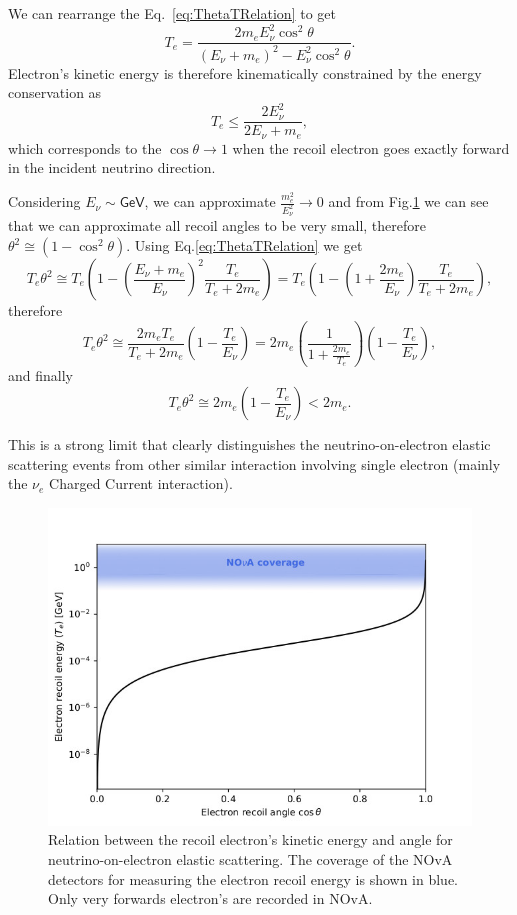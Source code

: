 We can rearrange the Eq.~\ref{eq:ThetaTRelation} to get
\begin{equation}\label{eq:TThetaRelation}
T_e=\frac{2m_eE_\nu^2\cos^2\theta}{\left(E_\nu+m_e\right)^2-E_\nu^2\cos^2\theta}.
\end{equation}
Electron's kinetic energy is therefore kinematically constrained by the energy conservation as
\begin{equation}
T_e\leq\frac{2E_{\nu}^2}{2E_{\nu}+m_e},
\end{equation}
which corresponds to the $\cos\theta\rightarrow 1$ when the recoil electron goes exactly forward in the incident neutrino direction.

Considering $E_{\nu}\sim\textsf{GeV}$, we can approximate $\frac{m_e^2}{E_{\nu}^2}\rightarrow 0$ and from Fig.\ref{fig:TThetaDistribution} we can see that we can approximate all recoil angles to be very small, therefore $\theta^2\cong \left(1-\cos^2\theta\right)$. Using Eq.\ref{eq:ThetaTRelation} we get
\begin{equation}
T_e\theta^2\cong T_e\left(1-\left(\frac{E_\nu+m_e}{E_\nu}\right)^2\frac{T_e}{T_e+2m_e}\right)
=T_e\left(1-\left(1+\frac{2m_e}{E_\nu}\right)\frac{T_e}{T_e+2m_e}\right),
\end{equation}
therefore
\begin{equation}
T_e\theta^2\cong \frac{2m_eT_e}{T_e+2m_e}\left(1-\frac{T_e}{E_\nu}\right)=2m_e\left(\frac{1}{1+\frac{2m_e}{T_e}}\right)\left(1-\frac{T_e}{E_\nu}\right),
\end{equation}
and finally
\begin{equation}\label{eqTThetaSqExp}
T_e\theta^2\cong 2m_e\left(1-\frac{T_e}{E_{\nu}}\right)<2m_e.
\end{equation}

This is a strong limit that clearly distinguishes the neutrino-on-electron elastic scattering events from other similar interaction involving single electron (mainly the $\nu_e$ Charged Current interaction).

\begin{figure}[hbtp]
\centering
\includegraphics[width=.7\linewidth]{Plots/NuMM/KinematicsTOnTh.jpeg}
\caption{Relation between the recoil electron's kinetic energy and angle for neutrino-on-electron elastic scattering. The coverage of the NOvA detectors for measuring the electron recoil energy is shown in blue. Only very forwards electron's are recorded in NOvA.}
\label{fig:TThetaDistribution}
\end{figure}

